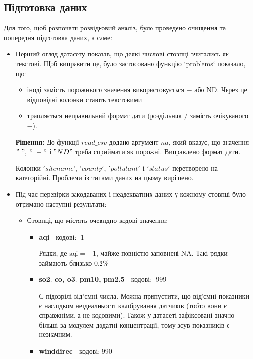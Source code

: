 \documentclass[./report.tex]{subfiles}
\begin{document}
\subsection{Підготовка даних}
Для того, щоб розпочати розвідковий аналіз, було проведено очищення та попередня підготовка даних, а саме: 
\begin{itemize}
    \item Перший огляд датасету показав, що деякі числові стовпці зчитались як текстові. 
    Щоб виправити це, було застосовано функцію `problems` показало, що:
        \begin{itemize}
            \item іноді замість порожнього значення використовується $-$ або ND. Через це відповідні колонки стають текстовими
            \item трапляється неправильний формат дати (роздільник $/$ замість очікуваного $-$).
        \end{itemize}
   \textbf{Рішення:} До функції $read\_csv$ додано аргумент $na$, який вказує, що значення $" \ "$, $"\ -"$ і $"ND"$ треба сприймати як порожні. Виправлено формат дати.
   
   Колонки $'sitename'$, $'county'$, $'pollutant'$ і $'status'$ перетворено на категорійні. Проблеми із типами даних на цьому вирішено.
   
   \newpage
   
    \item Під час перевірки закодаваних і неадекватних даних у кожному стовпці було отримано наступні результати: 
         \begin{itemize}
             \item Стовпці, що містять очевидно кодові значення:
             \begin{itemize}
                \item \textbf{aqi} - кодові: -1
                
                Рядки, де $\text{aqi} = -1$, майже повністю заповнені NA. Такі рядки займають близько $0.2\%$
                \item \textbf{so2, co, o3, pm10, pm2.5}  - кодові: -999
                
                Є підозрілі від'ємні числа. Можна припустити, що від'ємні показники є наслідком неідеалньості калібрування датчиків (тобто вони є справжніми, а не кодовими). Також у датасеті зафіксовані значно більші за модулем додатні концентрації, тому зсув показників є незначним.
                \item \textbf{winddirec} - кодові: 990
             \end{itemize}
             

\end{itemize}
\end{itemize}
\end{document}
